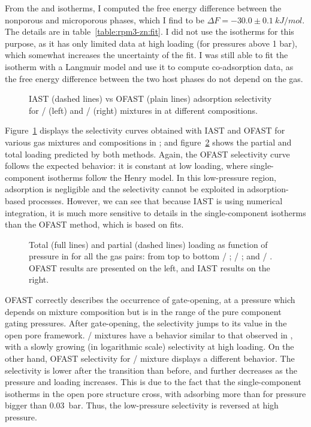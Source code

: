 \documentclass[thesis]{subfiles}
\begin{document}
From the  and  isotherms, I computed the free energy
difference between the nonporous and microporous phases, which I find to be
$\Delta F = -30.0 \pm \SI{0.1}{kJ/mol}$. The details are in
table~\ref{table:rpm3-zn:fit}. I did not use the  isotherms for this
purpose, as it has only limited data at high loading (for pressures above 1
bar), which somewhat increases the uncertainty of the fit. I was still able to
fit the  isotherm with a Langmuir model and use it to compute
co-adsorption data, as the free energy difference between the two host phases do
not depend on the gas.

\begin{figure}[htp]
    \centering
    
    \caption{IAST (dashed lines) vs OFAST (plain lines) adsorption selectivity
    for / (left) and / (right) mixtures
    in \RPMZn at different compositions.}
    \label{fig:rpm3-zn:iast-ofast:selectivity}
\end{figure}

Figure~\ref{fig:rpm3-zn:iast-ofast:selectivity} displays the selectivity curves
obtained with IAST and OFAST for various gas mixtures and compositions in
\RPMZn; and figure~\ref{fig:rpm3-zn:iast-ofast:loadings} shows the partial and
total loading predicted by both methods. Again, the OFAST selectivity curve
follows the expected behavior: it is constant at low loading, where
single-component isotherms follow the Henry model. In this low-pressure region,
adsorption is negligible and the selectivity cannot be exploited in
adsorption-based processes. However, we can see that because IAST is using
numerical integration, it is much more sensitive to details in the
single-component isotherms than the OFAST method, which is based on fits.

\begin{figure}[p]
    \centering
    
    \caption{Total (full lines) and partial (dashed lines) loading as function
    of pressure in \RPMZn for all the gas pairs: from top to bottom  /
    ;  / ; and  / . OFAST results
    are presented on the left, and IAST results on the right.}
    \label{fig:rpm3-zn:iast-ofast:loadings}
\end{figure}

OFAST correctly describes the occurrence of gate-opening, at a pressure which
depends on mixture composition but is in the range of the pure component gating
pressures. After gate-opening, the selectivity jumps to its value in the open
pore framework. / mixtures have a behavior similar to that
observed in \Cudhbc, with a slowly growing (in logarithmic scale) selectivity at
high loading. On the other hand, OFAST selectivity for /
mixture displays a different behavior. The selectivity is lower after the
transition than before, and further decreases as the pressure and loading
increases. This is due to the fact that the single-component isotherms in the
open pore structure cross, with  adsorbing more than  for
pressure bigger than \SI{0.03}{bar}. Thus, the low-pressure selectivity is
reversed at high pressure.
\end{document}
